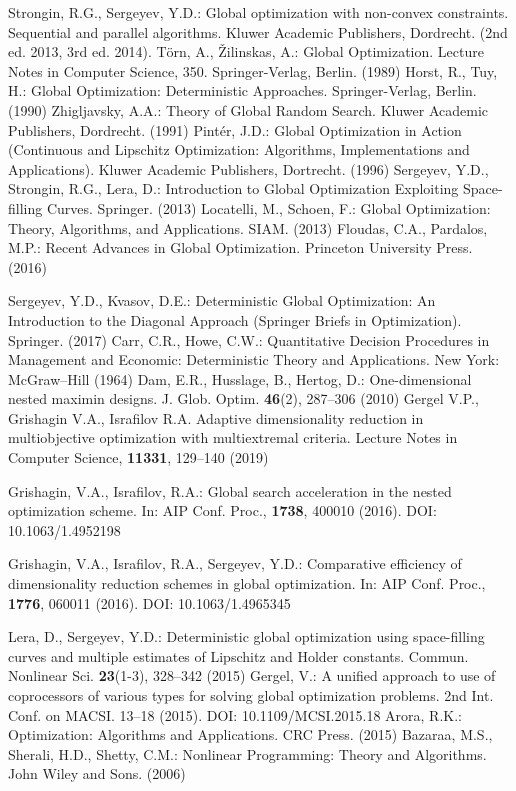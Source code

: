\documentclass[smallextended]{svjour3}       %
\begin{document}
\begin{thebibliography}{}
 Strongin, R.G., Sergeyev, Y.D.: Global optimization with non-convex constraints. Sequential and parallel algorithms. Kluwer Academic Publishers, Dordrecht. (2nd ed. 2013, 3rd ed. 2014).
 T\"orn, A., {\v Z}ilinskas, A.: Global Optimization. Lecture Notes in Computer Science, 350. Springer-Verlag, Berlin. (1989)
 Horst, R., Tuy, H.: Global Optimization: Deterministic Approaches. Springer-Verlag, Berlin. (1990)
 Zhigljavsky, A.A.: Theory of Global Random Search. Kluwer Academic Publishers, Dordrecht. (1991)
 Pint\'er, J.D.: Global Optimization in Action (Continuous and Lipschitz Optimization: Algorithms, Implementations and Applications). Kluwer Academic Publishers, Dortrecht. (1996)
 Sergeyev, Y.D., Strongin, R.G., Lera, D.: Introduction to Global Optimization Exploiting Space-filling Curves. Springer. (2013)
 Locatelli, M., Schoen, F.: Global Optimization: Theory, Algorithms, and Applications. SIAM. (2013)
 Floudas, C.A., Pardalos, M.P.: Recent Advances in Global Optimization. Princeton University Press. (2016)

 Sergeyev, Y.D., Kvasov, D.E.: Deterministic Global Optimization: An Introduction to the Diagonal Approach (Springer Briefs in Optimization). Springer. (2017)
 Carr, C.R., Howe, C.W.: Quantitative Decision Procedures in Management and Economic: Deterministic Theory and Applications. New York: McGraw–Hill (1964)
 Dam, E.R., Husslage, B., Hertog, D.: One-dimensional nested maximin designs. J. Glob. Optim. \textbf{46}(2), 287--306 (2010)
 Gergel V.P., Grishagin V.A., Israfilov R.A. Adaptive dimensionality reduction in multiobjective optimization with multiextremal criteria. Lecture Notes in Computer Science, \textbf{11331}, 129--140 (2019)


 Grishagin, V.A., Israfilov, R.A.: Global search acceleration in the nested optimization scheme. In: AIP Conf. Proc., \textbf{1738}, 400010 (2016). DOI: 10.1063/1.4952198

 Grishagin, V.A., Israfilov, R.A., Sergeyev, Y.D.: Comparative efficiency of dimensionality reduction schemes in global optimization. In: AIP Conf. Proc., \textbf{1776}, 060011 (2016). DOI: 10.1063/1.4965345




 Lera, D., Sergeyev, Y.D.: Deterministic global optimization using space-filling curves and multiple estimates of Lipschitz and Holder constants. Commun. Nonlinear Sci. \textbf{23}(1-3), 328--342 (2015)
 Gergel, V.: A unified approach to use of coprocessors of various types for solving global optimization problems. 2nd Int. Conf. on MACSI. 13--18 (2015). DOI: 10.1109/MCSI.2015.18
 Arora, R.K.: Optimization: Algorithms and Applications. CRC Press. (2015)
 Bazaraa, M.S., Sherali, H.D., Shetty, C.M.: Nonlinear Programming: Theory and Algorithms. John Wiley and Sons. (2006)


\end{thebibliography}
\end{document}
